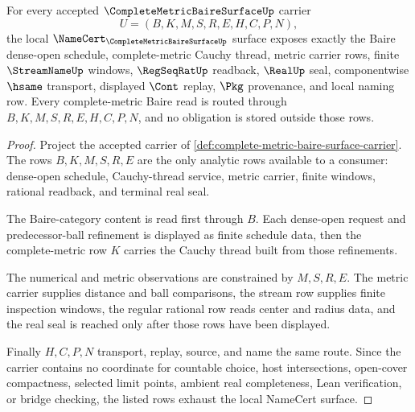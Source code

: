 \begin{theorem}
\label{thm:baire-category-complete-metric-namecert-surface}
For every accepted $\CompleteMetricBaireSurfaceUp$ carrier
$$
U=(B,K,M,S,R,E,H,C,P,N),
$$
the local $\NameCert_{\CompleteMetricBaireSurfaceUp}$ surface exposes exactly the Baire dense-open schedule, complete-metric Cauchy thread, metric carrier rows, finite $\StreamNameUp$ windows, $\RegSeqRatUp$ readback, $\RealUp$ seal, componentwise $\hsame$ transport, displayed $\Cont$ replay, $\Pkg$ provenance, and local naming row. Every complete-metric Baire read is routed through $B,K,M,S,R,E,H,C,P,N$, and no obligation is stored outside those rows.
\end{theorem}
\begin{proof}
Project the accepted carrier of \autoref{def:complete-metric-baire-surface-carrier}. The rows $B,K,M,S,R,E$ are the only analytic rows available to a consumer: dense-open schedule, Cauchy-thread service, metric carrier, finite windows, rational readback, and terminal real seal.

The Baire-category content is read first through $B$. Each dense-open request and predecessor-ball refinement is displayed as finite schedule data, then the complete-metric row $K$ carries the Cauchy thread built from those refinements.

The numerical and metric observations are constrained by $M,S,R,E$. The metric carrier supplies distance and ball comparisons, the stream row supplies finite inspection windows, the regular rational row reads center and radius data, and the real seal is reached only after those rows have been displayed.

Finally $H,C,P,N$ transport, replay, source, and name the same route. Since the carrier contains no coordinate for countable choice, host intersections, open-cover compactness, selected limit points, ambient real completeness, Lean verification, or bridge checking, the listed rows exhaust the local NameCert surface.
\end{proof}

